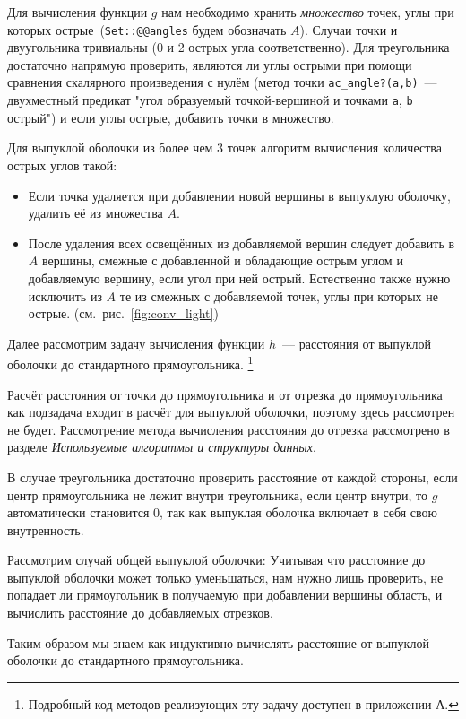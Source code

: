 \newpage

Для вычисления функции $g$ нам необходимо хранить \emph{множество} точек, углы при которых острые~(\verb|Set::@@angles| будем обозначать $A$). Случаи точки и двуугольника тривиальны (0 и 2 острых угла соответственно). Для треугольника достаточно напрямую проверить, являются ли углы острыми при помощи сравнения скалярного произведения с нулём (метод точки \verb|ac_angle?(a,b)|~--- двухместный предикат "угол образуемый точкой-вершиной и точками \verb|a|, \verb|b| острый") и если углы острые, добавить точки в множество.

Для выпуклой оболочки из более чем 3 точек алгоритм вычисления количества острых углов такой: 
\begin{itemize}
\item Если точка удаляется при добавлении новой вершины в выпуклую оболочку, удалить её из множества $A$.
\item После удаления всех освещённых из добавляемой вершин следует добавить в $A$ вершины, смежные с добавленной и обладающие острым углом и добавляемую вершину, если угол при ней острый. Естественно также нужно исключить из $A$ те из смежных с добавляемой точек, углы при которых не острые. (см.~рис.~\ref{fig:conv_light})
\end{itemize}

Далее рассмотрим задачу вычисления функции $h$~--- расстояния от выпуклой оболочки до стандартного прямоугольника. \footnote{Подробный код методов реализующих эту задачу доступен в приложении А.} 

Расчёт расстояния от точки до прямоугольника и от отрезка до прямоугольника как подзадача входит в  расчёт для выпуклой оболочки, поэтому здесь рассмотрен не будет. Рассмотрение метода вычисления расстояния до отрезка рассмотрено в разделе \emph{Используемые алгоритмы и структуры данных}. 

В случае треугольника достаточно проверить расстояние от каждой стороны, если центр прямоугольника
 не лежит внутри треугольника, если центр внутри, то $g$ автоматически становится $0$, так как 
 выпуклая оболочка включает в себя свою внутренность.

Рассмотрим случай общей выпуклой оболочки:
Учитывая что расстояние до выпуклой оболочки может только уменьшаться, нам нужно лишь проверить, не попадает ли прямоугольник в получаемую при добавлении вершины область, и вычислить расстояние до добавляемых отрезков.

Таким образом мы знаем как индуктивно вычислять расстояние от выпуклой оболочки до стандартного прямоугольника.

